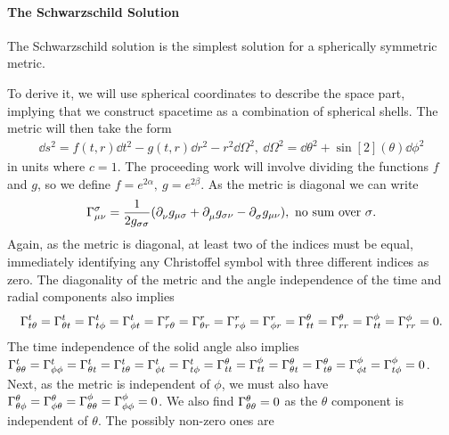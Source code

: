 \paragraph{The Schwarzschild Solution}
The Schwarzschild solution is the simplest solution for a spherically symmetric metric.

To derive it, we will use spherical coordinates to describe the space part, implying that we construct spacetime as a combination of spherical shells. The metric will then take the form
\begin{align*}
	\dd{s}^{2} = f(t, r)\dd{t}^{2} - g(t, r)\dd{r}^{2} - r^{2}\dd{\Omega}^{2},\ \dd{\Omega}^{2} = \dd{\theta}^{2} + \sin[2](\theta)\dd{\phi}^{2}
\end{align*}
in units where $c = 1$. The proceeding work will involve dividing the functions $f$ and $g$, so we define $f = e^{2\alpha},\ g = e^{2\beta}$. As the metric is diagonal we can write
\begin{align*}
	\chris{\sigma}{\mu}{\nu} = \frac{1}{2g_{\sigma\sigma}}(\del{\nu}{g_{\mu\sigma}} + \del{\mu}{g_{\sigma\nu}} - \del{\sigma}{g_{\mu\nu}}),\ \text{no sum over $\sigma$.}
\end{align*}
Again, as the metric is diagonal, at least two of the indices must be equal, immediately identifying any Christoffel symbol with three different indices as zero. The diagonality of the metric and the angle independence of the time and radial components also implies
\begin{align*}
	\chris{t}{t}{\theta} = \chris{t}{\theta}{t} = \chris{t}{t}{\phi} = \chris{t}{\phi}{t} = \chris{r}{r}{\theta} = \chris{r}{\theta}{r} = \chris{r}{r}{\phi} = \chris{r}{\phi}{r} = \chris{\theta}{t}{t} = \chris{\theta}{r}{r} = \chris{\phi}{t}{t} = \chris{\phi}{r}{r} = 0.
\end{align*}
The time independence of the solid angle also implies $\chris{t}{\theta}{\theta} = \chris{t}{\phi}{\phi} = \chris{t}{\theta}{t} = \chris{t}{t}{\theta} = \chris{t}{\phi}{t} = \chris{t}{t}{\phi} = \chris{\theta}{t}{t} = \chris{\phi}{t}{t} = \chris{\theta}{\theta}{t} = \chris{\theta}{t}{\theta} = \chris{\phi}{\phi}{t} = \chris{\phi}{t}{\phi} = 0$. Next, as the metric is independent of $\phi$, we must also have $\chris{\theta}{\theta}{\phi} =	\chris{\theta}{\phi}{\theta} = \chris{\phi}{\theta}{\theta} = \chris{\phi}{\phi}{\phi} = 0$. We also find $\chris{\theta}{\theta}{\theta} = 0$ as the $\theta$ component is independent of $\theta$. The possibly non-zero ones are
